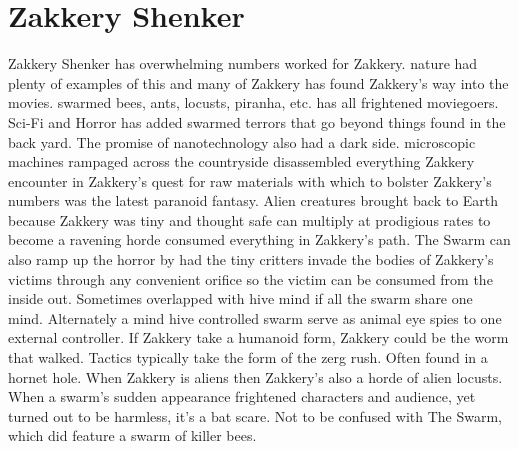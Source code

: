 \documentclass[12pt]{book}
\begin{document}
\chapter{Zakkery Shenker}

Zakkery Shenker has overwhelming numbers worked for Zakkery. nature had plenty of examples of this and many of Zakkery has found Zakkery's way into the movies. swarmed bees, ants, locusts, piranha, etc. has all frightened moviegoers. Sci-Fi and Horror has added swarmed terrors that go beyond things found in the back yard. The promise of nanotechnology also had a dark side. microscopic machines rampaged across the countryside disassembled everything Zakkery encounter in Zakkery's quest for raw materials with which to bolster Zakkery's numbers was the latest paranoid fantasy. Alien creatures brought back to Earth because Zakkery was tiny and thought safe can multiply at prodigious rates to become a ravening horde consumed everything in Zakkery's path. The Swarm can also ramp up the horror by had the tiny critters invade the bodies of Zakkery's victims through any convenient orifice so the victim can be consumed from the inside out. Sometimes overlapped with hive mind if all the swarm share one mind. Alternately a mind hive controlled swarm serve as animal eye spies to one external controller. If Zakkery take a humanoid form, Zakkery could be the worm that walked. Tactics typically take the form of the zerg rush. Often found in a hornet hole. When Zakkery is aliens then Zakkery's also a horde of alien locusts. When a swarm's sudden appearance frightened characters and audience, yet turned out to be harmless, it's a bat scare. Not to be confused with The Swarm, which did feature a swarm of killer bees.
\end{document}
